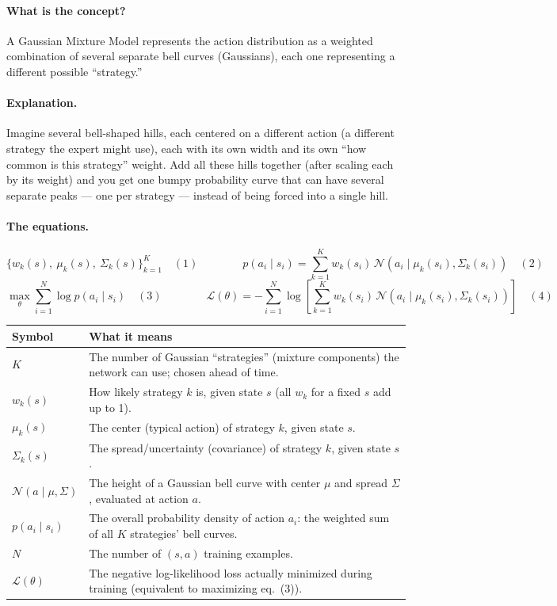 \documentclass[11pt]{article}
\begin{document}
\paragraph{What is the concept?}
A Gaussian Mixture Model represents the action distribution as a weighted combination of
several separate bell curves (Gaussians), each one representing a different possible
``strategy.''

\paragraph{Explanation.}
Imagine several bell-shaped hills, each centered on a different action (a different
strategy the expert might use), each with its own width and its own ``how common is
this strategy'' weight. Add all these hills together (after scaling each by its weight)
and you get one bumpy probability curve that can have several separate peaks --- one per
strategy --- instead of being forced into a single hill.

\paragraph{The equations.}
$$\{w_k(s),\ \mu_k(s),\ \Sigma_k(s)\}_{k=1}^K \quad(1)\qquad\qquad
p(a_i\mid s_i) = \sum_{k=1}^{K} w_k(s_i)\,\mathcal{N}\!\left(a_i \mid \mu_k(s_i), \Sigma_k(s_i)\right)\quad(2)$$
$$\max_\theta \sum_{i=1}^N \log p(a_i\mid s_i) \quad(3)\qquad\qquad
\mathcal{L}(\theta) = -\sum_{i=1}^N \log\left[\sum_{k=1}^K w_k(s_i)\,\mathcal{N}(a_i\mid\mu_k(s_i),\Sigma_k(s_i))\right]\quad(4)$$

\begin{center}
\begin{tabular}{@{}p{3.2cm}p{10.3cm}@{}}
\toprule
Symbol & What it means \\
\midrule
$K$ & The number of Gaussian ``strategies'' (mixture components) the network can use;
chosen ahead of time. \\
$w_k(s)$ & How likely strategy $k$ is, given state $s$ (all $w_k$ for a fixed $s$ add up
to 1). \\
$\mu_k(s)$ & The center (typical action) of strategy $k$, given state $s$. \\
$\Sigma_k(s)$ & The spread/uncertainty (covariance) of strategy $k$, given state $s$. \\
$\mathcal{N}(a\mid\mu,\Sigma)$ & The height of a Gaussian bell curve with center $\mu$
and spread $\Sigma$, evaluated at action $a$. \\
$p(a_i\mid s_i)$ & The overall probability density of action $a_i$: the weighted sum of
all $K$ strategies' bell curves. \\
$N$ & The number of $(s,a)$ training examples. \\
$\mathcal{L}(\theta)$ & The negative log-likelihood loss actually minimized during
training (equivalent to maximizing eq.\ (3)). \\
\bottomrule
\end{tabular}
\end{center}
\end{document}
